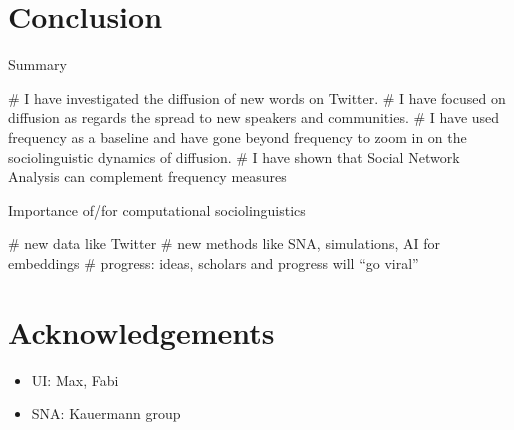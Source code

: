 \documentclass[
  a4paper,
  abstract=on,
  captions=tableabove
  ]{scrartcl}
\begin{document}
\section{Conclusion}
  \label{sec:conclusion}

  Summary

    \begin{qitem}
      # I have investigated the diffusion of new words on Twitter.
      # I have focused on diffusion as regards the spread to new speakers and communities.
      # I have used frequency as a baseline and have gone beyond frequency to zoom in on the sociolinguistic dynamics of diffusion.
      # I have shown that Social Network Analysis can complement frequency measures
    \end{qitem}

  Importance of/for computational sociolinguistics

    \begin{qitem}
      # new data like Twitter
      # new methods like SNA, simulations, AI for embeddings
      # progress: ideas, scholars and progress will ``go viral''
    \end{qitem}


\printbibliography

\section*{Acknowledgements}

\begin{itemize}
  \item UI: Max, Fabi
  \item SNA: Kauermann group
\end{itemize}
\end{document}
